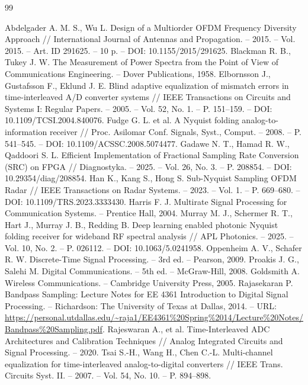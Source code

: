 \documentclass[a4paper,12pt]{article}
\numberwithin{equation}{section}
\begin{document}
\begin{thebibliography}{99}

Abdelgader A. M. S., Wu L. Design of a Multiorder OFDM Frequency Diversity Approach // International Journal of Antennas and Propagation. -- 2015. -- Vol. 2015. -- Art. ID 291625. -- 10 p. -- DOI: 10.1155/2015/291625.
Blackman R. B., Tukey J. W. The Measurement of Power Spectra from the Point of View of Communications Engineering. -- Dover Publications, 1958.
Elbornsson J., Gustafsson F., Eklund J. E. Blind adaptive equalization of mismatch errors in time-interleaved A/D converter systems // IEEE Transactions on Circuits and Systems I: Regular Papers. -- 2005. -- Vol. 52, No. 1. -- P. 151--159. -- DOI: 10.1109/TCSI.2004.840076.
Fudge G. L. et al. A Nyquist folding analog-to-information receiver // Proc. Asilomar Conf. Signals, Syst., Comput. -- 2008. -- P. 541--545. -- DOI: 10.1109/ACSSC.2008.5074477.
Gadawe N. T., Hamad R. W., Qaddoori S. L. Efficient Implementation of Fractional Sampling Rate Conversion (SRC) on FPGA // Diagnostyka. -- 2025. -- Vol. 26, No. 3. -- P. 208854. -- DOI: 10.29354/diag/208854.
Han K., Kang S., Hong S. Sub-Nyquist Sampling OFDM Radar // IEEE Transactions on Radar Systems. -- 2023. -- Vol. 1. -- P. 669--680. -- DOI: 10.1109/TRS.2023.3333430.
Harris F. J. Multirate Signal Processing for Communication Systems. -- Prentice Hall, 2004.
Murray M. J., Schermer R. T., Hart J., Murray J. B., Redding B. Deep learning enabled photonic Nyquist folding receiver for wideband RF spectral analysis // APL Photonics. -- 2025. -- Vol. 10, No. 2. -- P. 026112. -- DOI: 10.1063/5.0241958.
Oppenheim A. V., Schafer R. W. Discrete-Time Signal Processing. -- 3rd ed. -- Pearson, 2009.
Proakis J. G., Salehi M. Digital Communications. -- 5th ed. -- McGraw-Hill, 2008.
Goldsmith A. Wireless Communications. -- Cambridge University Press, 2005.
Rajasekaran P. Bandpass Sampling: Lecture Notes for EE 4361 Introduction to Digital Signal Processing. -- Richardson: The University of Texas at Dallas, 2014. -- URL: \url{https://personal.utdallas.edu/~raja1/EE4361\%20Spring\%2014/Lecture\%20Notes/Bandpass\%20Sampling.pdf}.
Rajeswaran A., et al. Time-Interleaved ADC Architectures and Calibration Techniques // Analog Integrated Circuits and Signal Processing. -- 2020.
Tsai S.-H., Wang H., Chen C.-L. Multi-channel equalization for time-interleaved analog-to-digital converters // IEEE Trans. Circuits Syst. II. -- 2007. -- Vol. 54, No. 10. -- P. 894--898.

\end{thebibliography}
\end{document}
